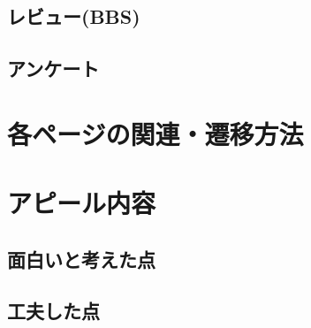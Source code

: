 \documentclass[11pt,a4paper, uplatex]{jsarticle}
\begin{document}
\subsection{レビュー(BBS)}
\subsection{アンケート}
\section{各ページの関連・遷移方法}

\section{アピール内容}
\subsection{面白いと考えた点}
\subsection{工夫した点}
\end{document}
